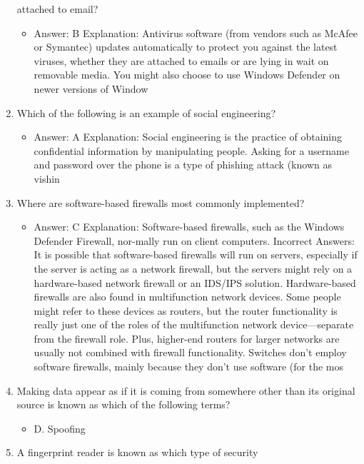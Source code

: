 \documentclass{article}
\begin{document}
\begin{enumerate}
attached to email?
     \begin{itemize}
         \item  Answer:   B                Explanation:        Antivirus software (from vendors such as McAfee or Symantec) updates automatically to protect you against the latest viruses, whether they are attached to emails or are lying in wait on removable media. You might also choose to use Windows Defender on newer versions of Window
     \end{itemize}
     \item Which of the following is an example of social engineering?
     \begin{itemize}
         \item   Answer:   A                Explanation:        Social engineering is the practice of obtaining confidential information by manipulating people. Asking for a username and password over the phone is a type of phishing attack (known as vishin
     \end{itemize}
     \item Where are software-based firewalls most commonly implemented?
     \begin{itemize}
         \item Answer:   C                Explanation:        Software-based firewalls, such as the Windows Defender Firewall, nor-mally run on client computers.                Incorrect        Answers:        It is possible that software-based firewalls will run on servers, especially if the server is acting as a network firewall, but the servers might rely on a hardware-based network firewall or an IDS/IPS solution. Hardware-based firewalls are also found in multifunction network devices. Some people might refer to these devices as routers, but the router functionality is really just one of the roles of the multifunction network device—separate from the firewall role. Plus, higher-end routers for larger networks are usually not combined with firewall functionality. Switches don’t employ software firewalls, mainly because they don’t use software (for the mos
     \end{itemize}
     \item Making data appear as if it is coming from somewhere other than
its original source is known as which of the following terms?
     \begin{itemize}
         \item D. Spoofing
     \end{itemize}
     \item A fingerprint reader is known as which type of security

\end{enumerate}
\end{document}
